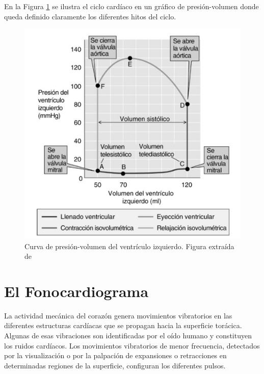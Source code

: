 \indent En la Figura \ref{fig:cardiac_cycle} se ilustra el ciclo cardíaco en un gráfico de presión-volumen donde
queda definido claramente los diferentes hitos del ciclo.

\begin{figure}[H]
    \centering
    \includegraphics[scale=0.65]{sections/chapter-02/images/cardiac_cycle.png}
    \caption[Curva de presión-volumen del ventrículo izquierdo.]{Curva de presión-volumen del ventrículo izquierdo.
    Figura extraída de \cite{bk:boron3ed}}
    \label{fig:cardiac_cycle}
\end{figure}

\section{El Fonocardiograma} \label{section:the-phonocardiogram}

    La actividad mecánica del corazón genera movimientos vibratorios en las diferentes estructuras cardíacas que se
    propagan hacia la superficie torácica. Algunas de esas vibraciones son identificadas por el oído humano y
    constituyen los ruidos cardíacos. Los movimientos vibratorios de menor frecuencia, detectados por la
    visualización o por la palpación de expansiones o retracciones en determinadas regiones de la superficie,
    configuran los diferentes pulsos.

